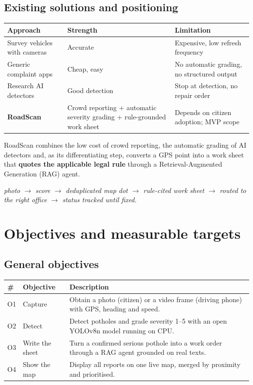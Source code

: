 \documentclass[11pt,a4paper,oneside]{report}
\begin{document}
\section{Existing solutions and positioning}
\begin{longtable}{@{}L{4cm}L{4.6cm}L{5.2cm}@{}}
\toprule\textbf{Approach} & \textbf{Strength} & \textbf{Limitation}\\\midrule\endhead
Survey vehicles with cameras & Accurate & Expensive, low refresh frequency\\
Generic complaint apps & Cheap, easy & No automatic grading, no structured output\\
Research AI detectors & Good detection & Stop at detection, no repair order\\
\textbf{RoadScan} & Crowd reporting + automatic severity grading + rule-grounded work sheet
& Depends on citizen adoption; MVP scope\\\bottomrule
\end{longtable}
RoadScan combines the low cost of crowd reporting, the automatic grading of AI detectors and, as its
differentiating step, converts a GPS point into a work sheet that \textbf{quotes the applicable legal rule}
through a Retrieval-Augmented Generation (RAG) agent.

\begin{center}\itshape photo $\rightarrow$ score $\rightarrow$ deduplicated map dot $\rightarrow$
rule-cited work sheet $\rightarrow$ routed to the right office $\rightarrow$ status tracked until fixed.\end{center}

\chapter{Objectives and measurable targets}
\section{General objectives}
\begin{longtable}{@{}L{1cm}L{3cm}L{10cm}@{}}
\toprule\textbf{\#} & \textbf{Objective} & \textbf{Description}\\\midrule\endhead
O1 & Capture & Obtain a photo (citizen) or a video frame (driving phone) with GPS, heading and speed.\\
O2 & Detect & Detect potholes and grade severity 1--5 with an open YOLOv8n model running on CPU.\\
O3 & Write the sheet & Turn a confirmed serious pothole into a work order through a RAG agent grounded on real texts.\\
O4 & Show the map & Display all reports on one live map, merged by proximity and prioritised.\\\bottomrule
\end{longtable}
\end{document}
